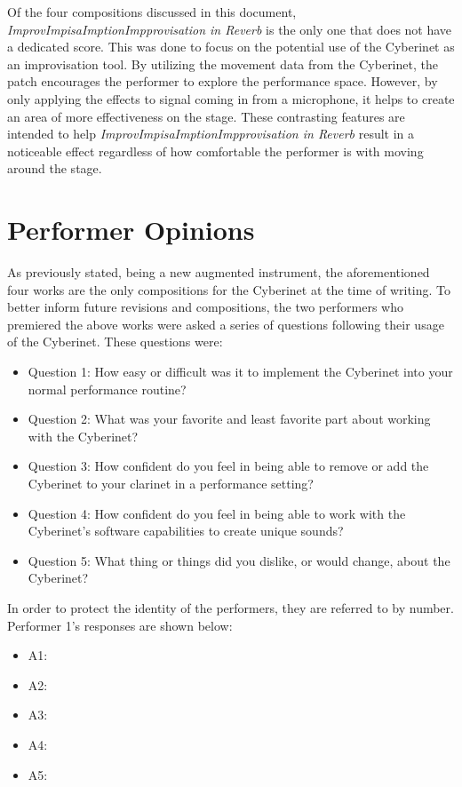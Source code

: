 Of the four compositions discussed in this document, \textit{ImprovImpisaImptionImpprovisation in Reverb} is the only one that does not have a dedicated score. This was done to focus on the potential use of the Cyberinet as an improvisation tool. By utilizing the movement data from the Cyberinet, the patch encourages the performer to explore the performance space. However, by only applying the effects to signal coming in from a microphone, it helps to create an area of more effectiveness on the stage. These contrasting features are intended to help \textit{ImprovImpisaImptionImpprovisation in Reverb} result in a noticeable effect regardless of how comfortable the performer is with moving around the stage.


\section{Performer Opinions}
As previously stated, being a new augmented instrument, the aforementioned four works are the only compositions for the Cyberinet at the time of writing. To better inform future revisions and compositions, the two performers who premiered the above works were asked a series of questions following their usage of the Cyberinet. These questions were:

\begin{itemize}
    \item Question 1: How easy or difficult was it to implement the Cyberinet into your normal performance routine?
    \item Question 2: What was your favorite and least favorite part about working with the Cyberinet? 
    \item Question 3: How confident do you feel in being able to remove or add the Cyberinet to your clarinet in a performance setting?
    \item Question 4: How confident do you feel in being able to work with the Cyberinet's software capabilities to create unique sounds?
    \item Question 5: What thing or things did you dislike, or would change, about the Cyberinet?
\end{itemize}

In order to protect the identity of the performers, they are referred to by number. Performer 1's responses are shown below: %

\begin{itemize}
    \item A1:
    \item A2:
    \item A3:
    \item A4:
    \item A5:
\end{itemize}

